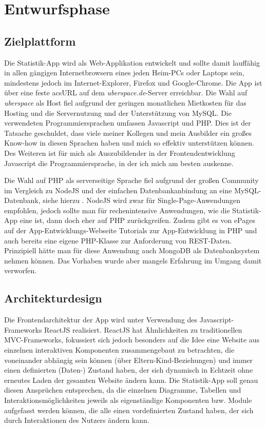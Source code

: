 \section{Entwurfsphase} 
\label{sec:Entwurfsphase}

\subsection{Zielplattform}
\label{sec:Zielplattform}

Die Statistik-App wird als Web-Applikation entwickelt und sollte damit lauffähig in allen gängigen Internetbrowsern eines jeden Heim-PCs oder Laptops sein, mindestens jedoch im Internet-Explorer, Firefox und Google-Chrome. Die App ist über eine feste acs{URL} auf dem \textit{uberspace.de}-Server erreichbar. Die Wahl auf \textit{uberspace} als Host fiel aufgrund der geringen monatlichen Mietkosten für das Hosting und die Servernutzung und der Unterstützung von \acs{MySQL}. Die verwendeten Programmiersprachen umfassen Javascript und \acs{PHP}. Dies ist der Tatsache geschuldet, dass viele meiner Kollegen und mein Ausbilder ein großes Know-how in diesen Sprachen haben und mich so effektiv unterstützen können. Des Weiteren ist für mich als Auszubildender in der Frontendentwicklung Javascript die Programmiersprache, in der ich mich am besten auskenne.

Die Wahl auf \acs{PHP} als serverseitige Sprache fiel aufgrund der großen Community im Vergleich zu \acs{NodeJS} und der einfachen Datenbankanbindung an eine MySQL-Datenbank, siehe hierzu \cite{PHP}. NodeJS wird zwar für Single-Page-Anwendungen empfohlen, jedoch sollte man für rechenintensive Anwendungen, wie die Statistik-App eine ist, dann doch eher auf PHP zurückgreifen. Zudem gibt es von ePages auf der App-Entwicklungs-Webseite Tutorials zur App-Entwicklung in PHP und auch bereits eine eigene PHP-Klasse zur Anforderung von \acs{REST}-Daten. Prinzipiell hätte man für diese Anwendung auch \acs{MongoDB} als Datenbanksystem nehmen können. Das Vorhaben wurde aber mangels Erfahrung im Umgang damit verworfen.

\subsection{Architekturdesign}
\label{sec:Architekturdesign}

Die Frontendarchitektur der App wird unter Verwendung des Javascript-Frameworks ReactJS realisiert. ReactJS hat Ähnlichkeiten zu traditionellen \acs{MVC}-Frameworks, fokussiert sich jedoch besonders auf die Idee eine Website aus einzelnen interaktiven Komponenten zusammengebaut zu betrachten, die voneinander abhängig sein können (über Eltern-Kind-Beziehungen) und immer einen definierten (Daten-) Zustand haben, der sich dynamisch in Echtzeit ohne erneutes Laden der gesamten Website ändern kann.
Die Statistik-App soll genau diesen Ansprüchen entsprechen, da die einzelnen Diagramme, Tabellen und Interaktionsmöglichkeiten jeweils als eigenständige Komponenten bzw. Module aufgefasst werden können, die alle einen vordefinierten Zustand haben, der sich durch Interaktionen des Nutzers ändern kann.

